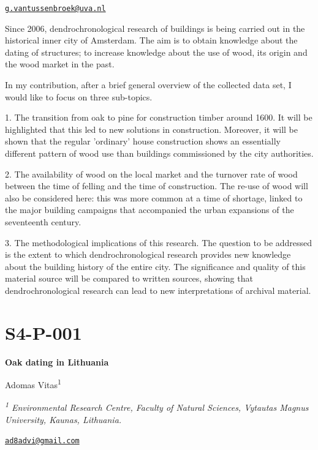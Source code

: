 \documentclass[
]{book}
\begin{document}
\href{mailto:g.vantussenbroek@uva.nl}{\nolinkurl{g.vantussenbroek@uva.nl}}

Since 2006, dendrochronological research of buildings is being carried out in the historical inner city of Amsterdam. The aim is to obtain knowledge about the dating of structures; to increase knowledge about the use of wood, its origin and the wood market in the past.

In my contribution, after a brief general overview of the collected data set, I would like to focus on three sub-topics.

1. The transition from oak to pine for construction timber around 1600. It will be highlighted that this led to new solutions in construction. Moreover, it will be shown that the regular 'ordinary' house construction shows an essentially different pattern of wood use than buildings commissioned by the city authorities.

2. The availability of wood on the local market and the turnover rate of wood between the time of felling and the time of construction. The re-use of wood will also be considered here: this was more common at a time of shortage, linked to the major building campaigns that accompanied the urban expansions of the seventeenth century.

3. The methodological implications of this research. The question to be addressed is the extent to which dendrochronological research provides new knowledge about the building history of the entire city. The significance and quality of this material source will be compared to written sources, showing that dendrochronological research can lead to new interpretations of archival material.

\hypertarget{s4-p-001}{%
\section*{S4-P-001}\label{s4-p-001}}

\textbf{Oak dating in Lithuania}

Adomas Vitas\textsuperscript{1}

\emph{\textsuperscript{1} Environmental Research Centre, Faculty of Natural Sciences, Vytautas Magnus University, Kaunas, Lithuania.}

\href{mailto:ad8advi@gmail.com}{\nolinkurl{ad8advi@gmail.com}}
\end{document}

